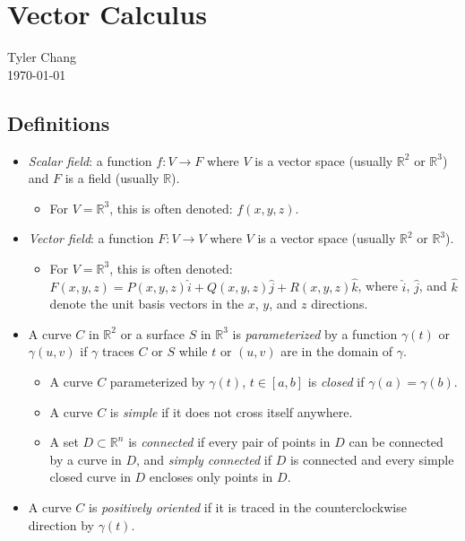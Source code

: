 \documentclass[12pt]{article}
\begin{document}
\section*{Vector Calculus}
Tyler Chang\\
\today

\subsection*{Definitions}

\begin{itemize}
\item {\it Scalar field}: a function $f : V \rightarrow F$ where $V$ is a vector
space (usually $\mathbb{R}^2$ or $\mathbb{R}^3$) and $F$ is a field 
(usually $\mathbb{R}$).
\begin{itemize}
\item For $V = \mathbb{R}^3$, this is often denoted: $f(x,y,z)$.
\end{itemize}
\item {\it Vector field}: a function $F : V \rightarrow V$ where $V$ is a vector
space (usually $\mathbb{R}^2$ or $\mathbb{R}^3$).
\begin{itemize}
\item For $V = \mathbb{R}^3$, this is often denoted: 
$F(x,y,z) = P(x,y,z)\hat{i} + Q(x,y,z)\hat{j} + R(x,y,z)\hat{k}$,
where $\hat{i}$, $\hat{j}$, and $\hat{k}$ denote the unit basis vectors in the
$x$, $y$, and $z$ directions.
\end{itemize}
\item A curve $C$ in $\mathbb{R}^2$ or a surface $S$ in $\mathbb{R}^3$ is
{\it parameterized} by a function $\gamma(t)$ or $\gamma(u,v)$ if $\gamma$
traces $C$ or $S$ while $t$ or $(u,v)$ are in the domain of $\gamma$.
\begin{itemize}
\item A curve $C$ parameterized by $\gamma(t)$, $t \in [a,b]$ is {\it closed}
if $\gamma(a) = \gamma(b)$.
\item A curve $C$ is {\it simple} if it does not cross itself anywhere.
\item A set $D\subset\mathbb{R}^n$ is {\it connected} if every pair of points
in $D$ can be connected by a curve in $D$, and {\it simply connected} if $D$
is connected and every simple closed curve in $D$ encloses only points in $D$.
\end{itemize}
\item A curve $C$ is {\it positively oriented} if it is traced in the 
counterclockwise direction by $\gamma(t)$.

\end{itemize}
\end{document}
